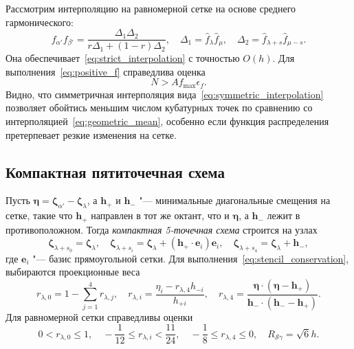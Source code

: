 \documentclass[a4paper,12pt]{article}
\newcommand{\bzeta}{\boldsymbol{\zeta}}
\newcommand{\bh}{\boldsymbol{h}}
\newcommand{\be}{\boldsymbol{e}}
\newcommand{\OO}[1]{O(#1)}
\begin{document}
Рассмотрим интерполяцию на равномерной сетке на основе среднего гармонического:
\begin{equation}\label{eq:symmetric_interpolation}
    f_{\alpha'}f_{\beta'} = \frac{\Delta_1\Delta_2}{r\Delta_1+(1-r)\Delta_2}, \quad
    \Delta_1 = \hat{f}_\lambda \hat{f}_\mu, \quad
    \Delta_2 = \hat{f}_{\lambda+s}\hat{f}_{\mu-s}.
\end{equation}
Она обеспечивает~\eqref{eq:strict_interpolation} с точностью \(\OO{h}\).
Для выполнения~\eqref{eq:positive_f} справедлива оценка
\begin{equation}\label{eq:positive_f_symmetric}
    N > A f_{\max} \epsilon_f.
\end{equation}
Видно, что симметричная интерполяция вида~\eqref{eq:symmetric_interpolation} позволяет обойтись
меньшим числом кубатурных точек по сравнению со интерполяцией~\eqref{eq:geometric_mean},
особенно если функция распределения претерпевает резкие изменения на сетке.

\subsection{Компактная пятиточечная схема}

Пусть \(\boldsymbol{\eta} = \bzeta_{\alpha'} - \bzeta_{\lambda}\),
а \(\bh_+\) и \(\bh_-\) "--- минимальные диагональные смещения на сетке,
такие что \(\bh_+\) направлен в тот же октант, что и \(\boldsymbol{\eta}\),
а \(\bh_-\) лежит в противоположном.
Тогда \emph{компактная 5-точечная схема} строится на узлах
\begin{equation}\label{eq:stencil_nodes5}
    \bzeta_{\lambda+s_0} = \bzeta_{\lambda}, \quad
    \bzeta_{\lambda+s_i} = \bzeta_{\lambda} + (\bh_+\cdot \be_i)\be_i, \quad
    \bzeta_{\lambda+s_4} = \bzeta_{\lambda} + \bh_-,
\end{equation}
где \(\be_i\) "--- базис прямоугольной сетки.
Для выполнения~\eqref{eq:stencil_conservation}, выбираются проекционные веса
\begin{equation}\label{eq:stencil_weights5}
    r_{\lambda,0} = 1 - \sum_{j=1}^4 r_{\lambda,j}, \quad
    r_{\lambda,i} = \frac{\eta_i - r_{\lambda,4}h_{-i}}{h_{+i}}, \quad
    r_{\lambda,4} = \frac{\boldsymbol{\eta}\cdot(\boldsymbol{\eta} - \bh_+)}
        {\bh_-\cdot(\bh_- - \bh_+)}.
\end{equation}
Для равномерной сетки справедливы оценки
\begin{equation}\label{eq:weights_ranges5}
    0 < r_{\lambda,0} \leq 1, \quad
    -\frac1{12} \leq r_{\lambda,i} < \frac{11}{24}, \quad
    -\frac18 \leq r_{\lambda,4} \leq 0, \quad
    R_{\mathcal{S}\gamma} = \sqrt6h.
\end{equation}
\end{document}
